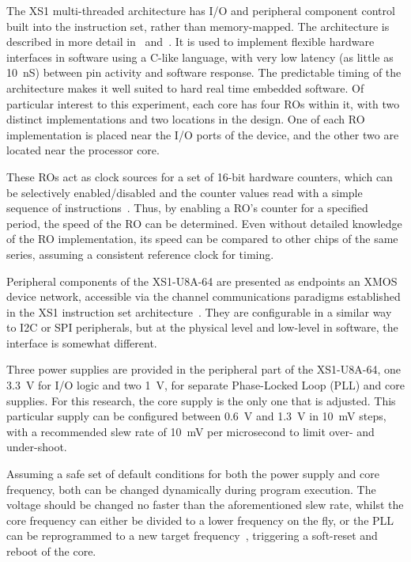 \documentclass[a4paper,twocolumn,DIV=16]{scrartcl}
\begin{document}
The XS1 multi-threaded architecture has I/O and peripheral component control
built into the instruction set, rather than memory-mapped. The architecture is
described in more detail in~\cite{XMOS2009a} and~\cite{XS1Lsys2008}. It is used
to implement flexible hardware interfaces in software using a C-like language,
with very low latency (as little as 10~nS) between pin activity and software
response. The predictable timing of the architecture makes it well suited to
hard real time embedded software. Of particular interest to this experiment,
each core has four ROs within it, with two distinct implementations and two
locations in the design.  One of each RO implementation is placed near the I/O
ports of the device, and the other two are located near the processor core.

These ROs act as clock sources for a set of 16-bit hardware counters, which can
be selectively enabled/disabled and the counter values read with a simple
sequence of instructions~\cite{XMOS2010a}. Thus, by enabling a RO's counter for
a specified period, the speed of the RO can be determined. Even without detailed
knowledge of the RO implementation, its speed can be compared to other chips of
the same series, assuming a consistent reference clock for timing.

Peripheral components of the XS1-U8A-64 are presented as endpoints an XMOS
device network, accessible via the channel communications paradigms established
in the XS1 instruction set architecture~\cite{XMOS2009a}. They are configurable
in a similar way to I2C or SPI peripherals, but at the physical level and
low-level in software, the interface is somewhat different.

Three power supplies are provided in the peripheral part of the XS1-U8A-64, one
3.3~V for I/O logic and two 1~V, for separate Phase-Locked Loop (PLL) and core
supplies. For this research, the core supply is the only one that is adjusted.
This particular supply can be configured between 0.6~V and 1.3~V in 10~mV steps,
with a recommended slew rate of 10~mV per microsecond to limit over- and
under-shoot.

Assuming a safe set of default conditions for both the power supply and core
frequency, both can be changed dynamically during program execution. The voltage
should be changed no faster than the aforementioned slew rate, whilst the core
frequency can either be divided to a lower frequency on the fly, or the PLL can
be reprogrammed to a new target frequency~\cite{XS1Lsys2008}, triggering a
soft-reset and reboot of the core.
\end{document}
